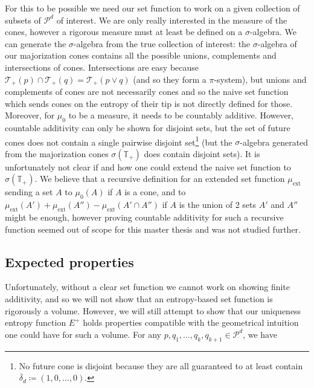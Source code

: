 For this to be possible we need our set function to work on a given collection of subsets of $\mathcal{P}^d$ of interest. We are only really interested in the measure of the cones, however a rigorous measure must at least be defined on a $\sigma$-algebra. We can generate the $\sigma$-algebra from the true collection of interest: the $\sigma$-algebra of our majorization cones contains all the possible unions, complements and intersections of cones. Intersections are easy because $\mathcal{T}_+(p) \cap \mathcal{T}_+(q) = \mathcal{T}_+(p \vee q)$ (and so they form a $\pi$-system), but unions and complements of cones are not necessarily cones and so the naive set function which sends cones on the entropy of their tip is not directly defined for those. Moreover, for $\mu_0$ to be a measure, it needs to be countably additive. However, countable additivity can only be shown for disjoint sets, but the set of future cones does not contain a single pairwise disjoint set\footnote{No future cone is disjoint because they are all guaranteed to at least contain $\overline{\delta}_d \coloneqq (1, 0, \dots, 0)$.} (but the $\sigma$-algebra generated from the majorization cones $\sigma(\mathbb{T_+})$ does contain disjoint sets). It is unfortunately not clear if and how one could extend the naive set function to $\sigma(\mathbb{T_+})$. We believe that a recursive definition for an extended set function $\mu_{\text{ext}}$ sending a set $A$ to $\mu_0(A)$ if $A$ is a cone, and to $\mu_{\text{ext}}(A') +\mu_{\text{ext}}(A'') - \mu_{\text{ext}}(A' \cap A'')$ if $A$ is the union of 2 sets $A'$ and $A''$ might be enough, however proving countable additivity for such a recursive function seemed out of scope for this master thesis and was not studied further.



\subsection{Expected properties} \label{sec:unique_entropy_properties}

Unfortunately, without a clear set function we cannot work on showing finite additivity, and so we will not show that an entropy-based set function is rigorously a volume. However, we will still attempt to show that our uniqueness entropy function $E^+$ holds properties compatible with the geometrical intuition one could have for such a volume. For any $p, q_1, \dots, q_k, q_{k+1} \in \mathcal{P}^d$, we have

